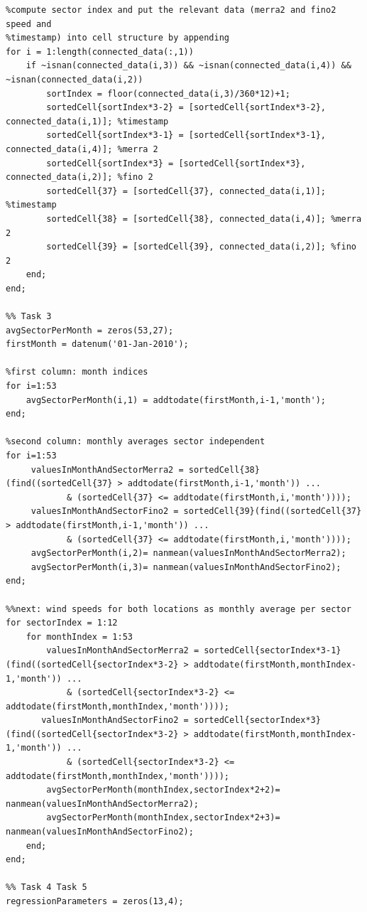\documentclass[10pt]{article}
\begin{document}
\begin{lstlisting}
%compute sector index and put the relevant data (merra2 and fino2 speed and
%timestamp) into cell structure by appending
for i = 1:length(connected_data(:,1))
    if ~isnan(connected_data(i,3)) && ~isnan(connected_data(i,4)) && ~isnan(connected_data(i,2))
        sortIndex = floor(connected_data(i,3)/360*12)+1;
        sortedCell{sortIndex*3-2} = [sortedCell{sortIndex*3-2}, connected_data(i,1)]; %timestamp
        sortedCell{sortIndex*3-1} = [sortedCell{sortIndex*3-1}, connected_data(i,4)]; %merra 2
        sortedCell{sortIndex*3} = [sortedCell{sortIndex*3}, connected_data(i,2)]; %fino 2
        sortedCell{37} = [sortedCell{37}, connected_data(i,1)]; %timestamp
        sortedCell{38} = [sortedCell{38}, connected_data(i,4)]; %merra 2
        sortedCell{39} = [sortedCell{39}, connected_data(i,2)]; %fino 2
    end;
end;

%% Task 3
avgSectorPerMonth = zeros(53,27);
firstMonth = datenum('01-Jan-2010');

%first column: month indices
for i=1:53
    avgSectorPerMonth(i,1) = addtodate(firstMonth,i-1,'month');
end;

%second column: monthly averages sector independent
for i=1:53
     valuesInMonthAndSectorMerra2 = sortedCell{38}(find((sortedCell{37} > addtodate(firstMonth,i-1,'month')) ...
            & (sortedCell{37} <= addtodate(firstMonth,i,'month'))));
     valuesInMonthAndSectorFino2 = sortedCell{39}(find((sortedCell{37} > addtodate(firstMonth,i-1,'month')) ...
            & (sortedCell{37} <= addtodate(firstMonth,i,'month'))));
     avgSectorPerMonth(i,2)= nanmean(valuesInMonthAndSectorMerra2);
     avgSectorPerMonth(i,3)= nanmean(valuesInMonthAndSectorFino2);
end;

%%next: wind speeds for both locations as monthly average per sector
for sectorIndex = 1:12
    for monthIndex = 1:53
        valuesInMonthAndSectorMerra2 = sortedCell{sectorIndex*3-1}(find((sortedCell{sectorIndex*3-2} > addtodate(firstMonth,monthIndex-1,'month')) ...
            & (sortedCell{sectorIndex*3-2} <= addtodate(firstMonth,monthIndex,'month'))));
       valuesInMonthAndSectorFino2 = sortedCell{sectorIndex*3}(find((sortedCell{sectorIndex*3-2} > addtodate(firstMonth,monthIndex-1,'month')) ...
            & (sortedCell{sectorIndex*3-2} <= addtodate(firstMonth,monthIndex,'month'))));
        avgSectorPerMonth(monthIndex,sectorIndex*2+2)= nanmean(valuesInMonthAndSectorMerra2);
        avgSectorPerMonth(monthIndex,sectorIndex*2+3)= nanmean(valuesInMonthAndSectorFino2);
    end;
end;

%% Task 4 Task 5
regressionParameters = zeros(13,4);


\end{lstlisting}
\end{document}

